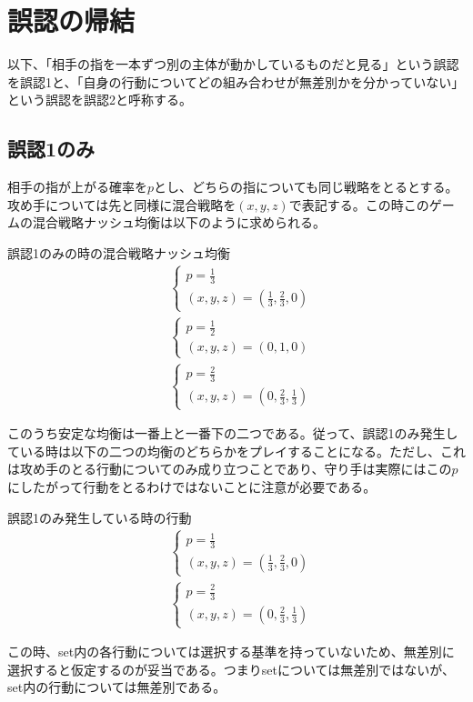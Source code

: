 \documentclass{jsarticle}
\begin{document}
\section{誤認の帰結}
以下、「相手の指を一本ずつ別の主体が動かしているものだと見る」という誤認を誤認1と、「自身の行動についてどの組み合わせが無差別かを分かっていない」という誤認を誤認2と呼称する。
\subsection{誤認1のみ}
相手の指が上がる確率を$p$とし、どちらの指についても同じ戦略をとるとする。攻め手については先と同様に混合戦略を$(x, y, z)$で表記する。この時このゲームの混合戦略ナッシュ均衡は以下のように求められる。
\begin{itembox}[l]{誤認1のみの時の混合戦略ナッシュ均衡}
\begin{align*}
    	&\begin{cases}
		p = \frac{1}{3}\\
		(x, y, z) = (\frac{1}{3}, \frac{2}{3}, 0)
	\end{cases}\\[10pt]
	&\begin{cases}
		p = \frac{1}{2}\\
		(x, y, z) = (0, 1, 0)
	\end{cases}\\[10pt]
	&\begin{cases}
		p = \frac{2}{3}\\
		(x, y, z) = (0, \frac{2}{3}, \frac{1}{3})
	\end{cases}
\end{align*}
\end{itembox}
このうち安定な均衡は一番上と一番下の二つである。従って、誤認1のみ発生している時は以下の二つの均衡のどちらかをプレイすることになる。ただし、これは攻め手のとる行動についてのみ成り立つことであり、守り手は実際にはこの$p$にしたがって行動をとるわけではないことに注意が必要である。
\begin{itembox}[l]{誤認1のみ発生している時の行動}
\begin{align}
    	&\begin{cases}
		p = \frac{1}{3}\\
		(x, y, z) = (\frac{1}{3}, \frac{2}{3}, 0)
	\end{cases}\\[10pt]
	&\begin{cases}
		p = \frac{2}{3}\\
		(x, y, z) = (0, \frac{2}{3}, \frac{1}{3})
	\end{cases}
\end{align}
\end{itembox}
この時、set内の各行動については選択する基準を持っていないため、無差別に選択すると仮定するのが妥当である。つまりsetについては無差別ではないが、set内の行動については無差別である。
\end{document}
